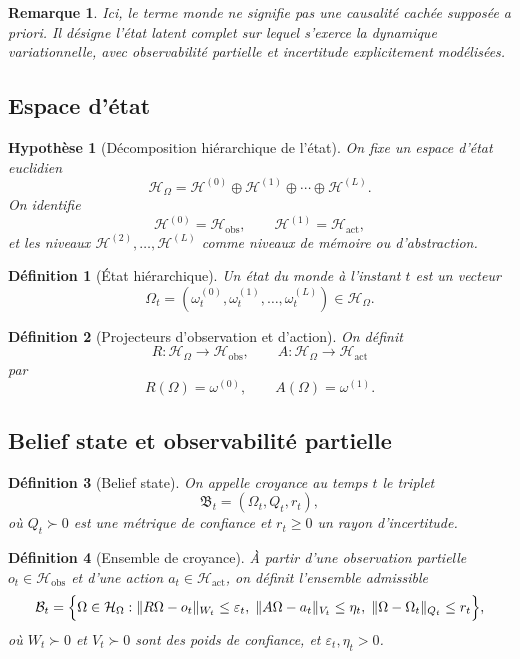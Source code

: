 \documentclass[11pt,a4paper]{article}
\newtheorem{definition}{Définition}[section]
\newtheorem{assumption}{Hypothèse}[section]
\newtheorem{remark}{Remarque}[section]
\newcommand{\Hh}{\mathcal H}
\newcommand{\1}{\mathbf 1}
\begin{document}
\begin{remark}
Ici, le terme \emph{monde} ne signifie pas une causalité cachée supposée a priori.  
Il désigne l'état latent complet sur lequel s'exerce la dynamique variationnelle, avec observabilité partielle et incertitude explicitement modélisées.
\end{remark}

\subsection{Espace d'état}

\begin{assumption}[Décomposition hiérarchique de l'état]
On fixe un espace d'état euclidien
\[
\Hh_\Omega=\Hh^{(0)}\oplus\Hh^{(1)}\oplus\cdots\oplus\Hh^{(L)}.
\]
On identifie
\[
\Hh^{(0)}=\Hh_{\mathrm{obs}},
\qquad
\Hh^{(1)}=\Hh_{\mathrm{act}},
\]
et les niveaux \(\Hh^{(2)},\dots,\Hh^{(L)}\) comme niveaux de mémoire ou d'abstraction.
\end{assumption}

\begin{definition}[État hiérarchique]
Un état du monde à l'instant \(t\) est un vecteur
\[
\Omega_t=(\omega_t^{(0)},\omega_t^{(1)},\dots,\omega_t^{(L)})\in\Hh_\Omega.
\]
\end{definition}

\begin{definition}[Projecteurs d'observation et d'action]
On définit
\[
R:\Hh_\Omega\to\Hh_{\mathrm{obs}},
\qquad
A:\Hh_\Omega\to\Hh_{\mathrm{act}}
\]
par
\[
R(\Omega)=\omega^{(0)},
\qquad
A(\Omega)=\omega^{(1)}.
\]
\end{definition}

\subsection{Belief state et observabilité partielle}

\begin{definition}[Belief state]
On appelle croyance au temps \(t\) le triplet
\[
\mathfrak B_t=(\Omega_t,Q_t,r_t),
\]
où \(Q_t\succ 0\) est une métrique de confiance et \(r_t\ge 0\) un rayon d'incertitude.
\end{definition}

\begin{definition}[Ensemble de croyance]
À partir d'une observation partielle \(o_t\in\Hh_{\mathrm{obs}}\) et d'une action \(a_t\in\Hh_{\mathrm{act}}\), on définit l'ensemble admissible
\[
\mathcal B_t
=
\Bigl\{
\Omega\in\Hh_\Omega:
\|R\Omega-o_t\|_{W_t}\le \varepsilon_t,\;
\|A\Omega-a_t\|_{V_t}\le \eta_t,\;
\|\Omega-\Omega_t\|_{Q_t}\le r_t
\Bigr\},
\]
où \(W_t\succ 0\) et \(V_t\succ 0\) sont des poids de confiance, et \(\varepsilon_t,\eta_t>0\).
\end{definition}
\end{document}
